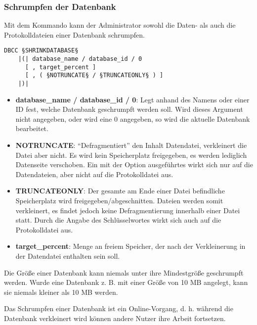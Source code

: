         \subsubsection{Schrumpfen der Datenbank}
          Mit dem Kommando  kann der Administrator
          sowohl die Daten- als auch die Protokolldateien einer Datenbank
          schrumpfen.
          \begin{lstlisting}[language=ebnf, caption={Die Syntax zu
          SHRINKDATABASE}, label=admin03_34]
DBCC §SHRINKDATABASE§
    |(| database_name / database_id / 0 
      [ , target_percent ]
      [ , ( §NOTRUNCATE§ / §TRUNCATEONLY§ ) ]
    |)| 
          \end{lstlisting}
          \begin{itemize}
            \item \textbf{database\_name / database\_id / 0}: Legt anhand des
            Namens oder einer ID fest, welche Datenbank geschrumpft werden soll.
            Wird dieses Argument nicht angegeben, oder wird eine 0 angegeben, so
            wird die aktuelle Datenbank bearbeitet.  
            \item \textbf{NOTRUNCATE}: \enquote{Defragmentiert} den
            Inhalt Datendatei, verkleinert die Datei aber nicht. Es wird
            kein Speicherplatz freigegeben, es werden lediglich Datenseite
            verschoben. Ein mit der Option 
            ausgeführtes  wirkt sich nur
            auf die Datendateien, aber nicht auf die Protokolldatei aus.
            \item \textbf{TRUNCATEONLY}: Der gesamte am Ende einer
            Datei befindliche Speicherplatz wird freigegeben/abgeschnitten.
            Dateien werden somit verkleinert, es findet jedoch keine
            Defragmentierung innerhalb einer Datei statt. Durch die Angabe des
            Schlüsselwortes  wirkt sich
             auch auf die Protokolldatei aus.
            \item \textbf{target\_percent}: Menge an freiem Speicher, der nach
            der Verkleinerung in der Datendatei enthalten sein soll.
          \end{itemize}
          \begin{merke}
            Die Größe einer Datenbank kann niemals unter ihre Mindestgröße
            geschrumpft werden. Wurde eine Datenbank z. B. mit einer Größe von 10
            MB angelegt, kann sie niemals kleiner als 10 MB werden.
          \end{merke}
          Das Schrumpfen einer Datenbank ist ein Online-Vorgang, d. h. während die
          Datenbank verkleinert wird können andere Nutzer ihre Arbeit fortsetzen.
          
